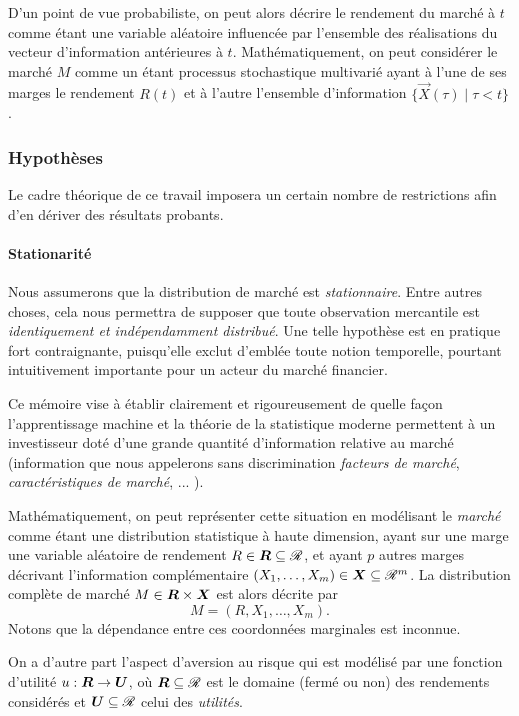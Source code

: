 D'un point de vue probabiliste, on peut alors décrire le rendement du marché à $t$ comme
étant une variable aléatoire influencée par l'ensemble des réalisations du vecteur
d'infor\-mation antérieures à $t$. Mathématiquement, on peut considérer le marché $M$
comme un étant processus stochastique multivarié ayant à l'une de ses marges le rendement
$R(t)$ et à l'autre l'ensemble d'information $\{\vec X(\tau) \mid \tau < t\}$.




\subsubsection{Hypothèses}

Le cadre théorique de ce travail imposera un certain nombre de restrictions afin d'en
dériver des résultats probants.

\paragraph{Stationarité}
Nous assumerons que la distribution de marché est \textit{stationnaire}. Entre autres
choses, cela nous permettra de supposer que toute observation mercantile est
\textit{identiquement et indépendamment distribué}\cit. Une telle hypothèse est en
pratique fort contraignante, puisqu'elle exclut d'emblée toute notion temporelle, pourtant
intuitivement importante pour un acteur du marché financier. 


Ce mémoire vise à établir clairement et rigoureusement de quelle façon l'apprentissage
machine et la théorie de la statistique moderne permettent à un investisseur doté d'une
grande quantité d'information relative au marché (information que nous appelerons sans
discrimination \textit{facteurs de marché}, \textit{caractéristiques de marché},
... \cit).

Mathématiquement, on peut représenter cette situation en modélisant le \textit{marché}
comme étant une distribution statistique à haute dimension, ayant sur une marge une
variable aléatoire de rendement $R \in \bm{R} \subseteq \mathscr{R}$, et ayant $p$ autres marges décrivant
l'information complémentaire $(X_1,\dots,X_m) \in \bm{X} \subseteq \mathscr{R}^m$. La distribution complète de
marché $M \in \bm{R} \times \bm{X}$ est alors décrite par
\begin{equation}
  M = (R,X_1,\dots,X_m).
\end{equation}
Notons que la dépendance entre ces coordonnées marginales est inconnue.

On a d'autre part l'aspect d'aversion au risque qui est modélisé par une fonction
d'utilité $u:\bm{R}\to\bm{U}$, où $\bm{R} \subseteq \mathscr{R}$ est le domaine (fermé ou non) des rendements considérés
et $\bm{U} \subseteq \mathscr{R}$ celui des \textit{utilités}.

